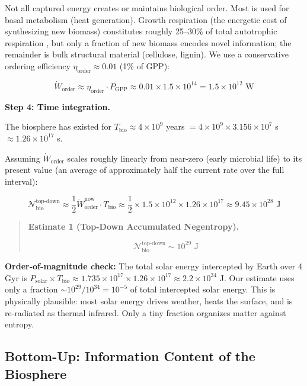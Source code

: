 \documentclass[11pt]{article}
\theoremstyle{plain}
\theoremstyle{definition}
\theoremstyle{remark}
\let\origsubsection\subsection
\renewcommand{\subsection}{\needspace{7\baselineskip}\origsubsection}
\begin{document}
Not all captured energy creates or maintains biological order. Most is
used for basal metabolism (heat generation). Growth respiration (the
energetic cost of synthesizing new biomass) constitutes roughly 25--30\%
of total autotrophic respiration \citep{Smil2002}, but only a fraction
of new biomass encodes novel information; the remainder is bulk
structural material (cellulose, lignin). We use a conservative ordering
efficiency \(\eta_{\text{order}} \approx 0.01\) (1\% of GPP):

\[\dot{W}_{\text{order}} \approx \eta_{\text{order}} \cdot P_{\text{GPP}} \approx 0.01 \times 1.5 \times 10^{14} = 1.5 \times 10^{12} \text{ W}\]

\textbf{Step 4: Time integration.}

The biosphere has existed for \(T_{\text{bio}} \approx 4 \times 10^9\)
years \(= 4 \times 10^9 \times 3.156 \times 10^7\) s
\(\approx 1.26 \times 10^{17}\) s.

Assuming \(\dot{W}_{\text{order}}\) scales roughly linearly from
near-zero (early microbial life) to its present value (an average of
approximately half the current rate over the full interval):

\[\mathcal{N}_{\text{bio}}^{\text{top-down}} \approx \frac{1}{2} \dot{W}_{\text{order}}^{\text{now}} \cdot T_{\text{bio}} \approx \frac{1}{2} \times 1.5 \times 10^{12} \times 1.26 \times 10^{17} \approx 9.45 \times 10^{28} \text{ J}\]

\begin{quote}
\textbf{Estimate 1 (Top-Down Accumulated Negentropy).}

\[\mathcal{N}_{\text{bio}}^{\text{top-down}} \sim 10^{29} \text{ J}\]
\end{quote}

\textbf{Order-of-magnitude check:} The total solar energy intercepted by
Earth over 4 Gyr is
\(P_{\text{solar}} \times T_{\text{bio}} \approx 1.735 \times 10^{17} \times 1.26 \times 10^{17} \approx 2.2 \times 10^{34}\)
J. Our estimate uses only a fraction \(\sim 10^{29}/10^{34} = 10^{-5}\)
of total intercepted solar energy. This is physically plausible: most
solar energy drives weather, heats the surface, and is re-radiated as
thermal infrared. Only a tiny fraction organizes matter against entropy.

\subsection{Bottom-Up: Information Content of the
Biosphere}\label{bottom-up-information-content-of-the-biosphere}
\end{document}
